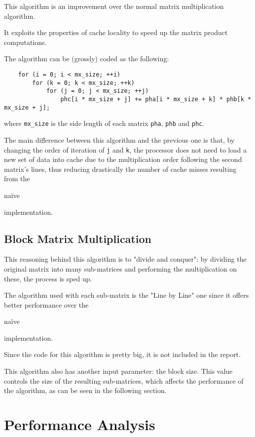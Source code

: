 \documentclass[11pt,a4paper]{article}
\begin{document}
This algorithm is an improvement over the normal matrix multiplication algorithm.

It exploits the properties of cache locality to speed up the matrix product computations.

The algorithm can be (grossly) coded as the following:
\begin{lstlisting}
    for (i = 0; i < mx_size; ++i)
        for (k = 0; k < mx_size; ++k)
            for (j = 0; j < mx_size; ++j)
                phc[i * mx_size + j] += pha[i * mx_size + k] * phb[k * mx_size + j];
\end{lstlisting}
where \lstinline{mx_size} is the side length of each matrix \lstinline{pha}, \lstinline{phb} and \lstinline{phc}.

The main difference between this algorithm and the previous one is that, by changing the order of iteration of \lstinline{j} and \lstinline{k}, the processor does not need to load a new set of data into cache due to the multiplication order following the second matrix's lines, thus reducing drastically the number of cache misses resulting from the \begin{em}naïve\end{em} implementation.

\subsection{Block Matrix Multiplication}

This reasoning behind this algorithm is to "divide and conquer": by dividing the original matrix into many sub-matrices and performing the multiplication on these, the process is sped up.

The algorithm used with each sub-matrix is the "Line by Line" one since it offers better performance over the \begin{em}naïve\end{em} implementation.

Since the code for this algorithm is pretty big, it is not included in the report.

This algorithm also has another input parameter: the block size. This value controls the size of the resulting sub-matrices, which affects the performance of the algorithm, as can be seen in the following section.

\section{Performance Analysis}
\end{document}
